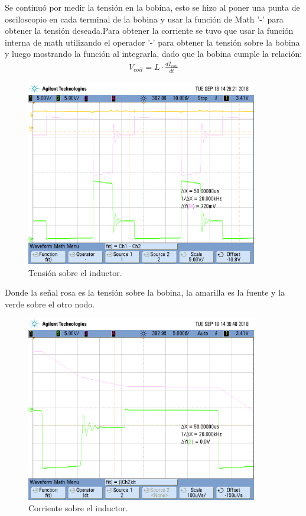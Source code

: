 Se continuó por medir la tensión en la bobina, esto se hizo al poner una punta de osciloscopio en cada terminal de la bobina y usar la función de Math '-' para obtener la tensión deseada.Para obtener la corriente se tuvo que usar la función interna de math utilizando el operador '-' para obtener la tensión sobre la bobina y luego mostrando la función al integrarla, dado que la bobina cumple la relación:
\begin{align} V_{coil} = L \cdot \frac{dI_{coil}}{dt}\end{align}
\begin{figure}[H]
	\centering
	\includegraphics[width=0.9\textwidth]{Imagenes/vcoil.png}
\caption{Tensión sobre el inductor.}
	\label{fig:vcoil}
\end{figure}
Donde la señal rosa es la tensión sobre la bobina, la amarilla es la fuente y la verde sobre el otro nodo.
\begin{figure}[H]
	\centering
	\includegraphics[width=0.9\textwidth]{Imagenes/icq_coil1.png}
\caption{Corriente sobre el inductor.}
	\label{fig:icoil}
\end{figure}
